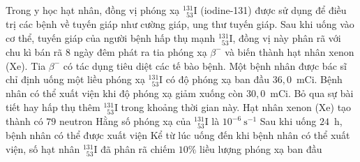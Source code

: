	\begin{ex}%
		Trong y học hạt nhân, đồng vị phóng xạ ${}^{131}_{\phantom{1}53}\text{I}$ (iodine-131) được sử dụng để điều trị các bệnh về tuyến giáp như cường giáp, ung thư tuyến giáp. Sau khi uống vào cơ thể, tuyến giáp của người bệnh hấp thụ mạnh ${}^{131}_{\phantom{1}53}\text{I}$, đồng vị này phân rã với chu kì bán rã $8$ ngày đêm phát ra tia phóng xạ $\beta^-$ và biến thành hạt nhân xenon (Xe). Tia $\beta^-$ có tác dụng tiêu diệt các tế bào bệnh. Một bệnh nhân được bác sĩ chỉ định uống một liều phóng xạ ${}^{131}_{\phantom{1}53}\text{I}$ có độ phóng xạ ban đầu $36{,}0$~mCi. Bệnh nhân có thể xuất viện khi độ phóng xạ giảm xuống còn $30{,}0$~mCi. Bỏ qua sự bài tiết hay hấp thụ thêm ${}^{131}_{\phantom{1}53}\text{I}$ trong khoảng thời gian này.
		\choiceTFt
		{Hạt nhân xenon (Xe) tạo thành có $79$ neutron}
		{\True Hằng số phóng xạ của ${}^{131}_{\phantom{1}53}\text{I}$ là $10^{-6}~\text{s}^{-1}$}
		{Sau khi uống $24$~h, bệnh nhân có thể được xuất viện}
		{Kể từ lúc uống đến khi bệnh nhân có thể xuất viện, số hạt nhân ${}^{131}_{\phantom{1}53}\text{I}$ đã phân rã chiếm $10\%$ liều lượng phóng xạ ban đầu}
	\end{ex}

